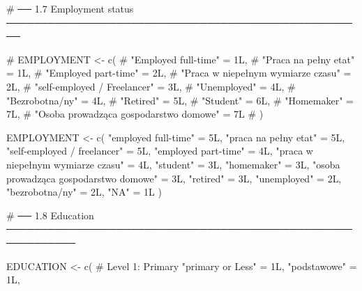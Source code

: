 \documentclass[
  letterpaper,
  DIV=11,
  numbers=noendperiod]{scrartcl}
\newenvironment{Shaded}{\begin{snugshade}}{\end{snugshade}}
\newcommand{\CommentTok}[1]{\textcolor[rgb]{0.37,0.37,0.37}{#1}}
\newcommand{\DecValTok}[1]{\textcolor[rgb]{0.68,0.00,0.00}{#1}}
\newcommand{\FunctionTok}[1]{\textcolor[rgb]{0.28,0.35,0.67}{#1}}
\newcommand{\NormalTok}[1]{\textcolor[rgb]{0.00,0.23,0.31}{#1}}
\newcommand{\OtherTok}[1]{\textcolor[rgb]{0.00,0.23,0.31}{#1}}
\newcommand{\StringTok}[1]{\textcolor[rgb]{0.13,0.47,0.30}{#1}}
\begin{document}
\begin{Shaded}
\begin{Highlighting}[]
\CommentTok{\# ── 1.7  Employment status ────────────────────────────────────────────────────}

\CommentTok{\# EMPLOYMENT \textless{}{-} c(}
\CommentTok{\#   "Employed full{-}time"                        = 1L,}
\CommentTok{\#   "Praca na pełny etat"                       = 1L,}
\CommentTok{\#   "Employed part{-}time"                        = 2L,}
\CommentTok{\#   "Praca w niepełnym wymiarze czasu"          = 2L,}
\CommentTok{\#   "self{-}employed / Freelancer"                = 3L,}
\CommentTok{\#   "Unemployed"                                = 4L,}
\CommentTok{\#   "Bezrobotna/ny"                             = 4L,}
\CommentTok{\#   "Retired"                                   = 5L,}
\CommentTok{\#   "Student"                                   = 6L,}
\CommentTok{\#   "Homemaker"                                 = 7L,}
\CommentTok{\#   "Osoba prowadząca gospodarstwo domowe"      = 7L}
\CommentTok{\# )}

\NormalTok{EMPLOYMENT }\OtherTok{\textless{}{-}} \FunctionTok{c}\NormalTok{(}
  \StringTok{"employed full{-}time"}                   \OtherTok{=} \DecValTok{5}\NormalTok{L,}
  \StringTok{"praca na pełny etat"}                  \OtherTok{=} \DecValTok{5}\NormalTok{L,}
  \StringTok{"self{-}employed / freelancer"}           \OtherTok{=} \DecValTok{5}\NormalTok{L,}
  \StringTok{"employed part{-}time"}                   \OtherTok{=} \DecValTok{4}\NormalTok{L,}
  \StringTok{"praca w niepełnym wymiarze czasu"}     \OtherTok{=} \DecValTok{4}\NormalTok{L,}
  \StringTok{"student"}                              \OtherTok{=} \DecValTok{3}\NormalTok{L,}
  \StringTok{"homemaker"}                            \OtherTok{=} \DecValTok{3}\NormalTok{L,}
  \StringTok{"osoba prowadząca gospodarstwo domowe"} \OtherTok{=} \DecValTok{3}\NormalTok{L,}
  \StringTok{"retired"}                              \OtherTok{=} \DecValTok{3}\NormalTok{L,}
  \StringTok{"unemployed"}                           \OtherTok{=} \DecValTok{2}\NormalTok{L,}
  \StringTok{"bezrobotna/ny"}                        \OtherTok{=} \DecValTok{2}\NormalTok{L,}
  \StringTok{"NA"}                                   \OtherTok{=} \DecValTok{1}\NormalTok{L}
\NormalTok{)}





\CommentTok{\# ── 1.8  Education ────────────────────────────────────────────────────────────}

\NormalTok{EDUCATION }\OtherTok{\textless{}{-}} \FunctionTok{c}\NormalTok{(}
  \CommentTok{\# Level 1: Primary}
  \StringTok{"primary or Less"}                            \OtherTok{=} \DecValTok{1}\NormalTok{L,}
  \StringTok{"podstawowe"}                                 \OtherTok{=} \DecValTok{1}\NormalTok{L,}
  

\end{Highlighting}
\end{Shaded}
\end{document}
